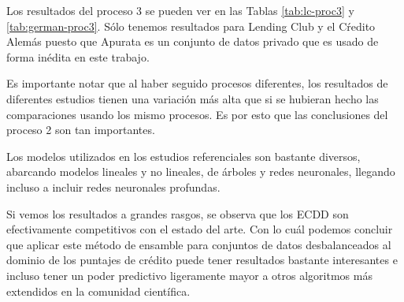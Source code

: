Los resultados del proceso 3 se pueden ver en las Tablas \ref{tab:lc-proc3} y \ref{tab:german-proc3}. Sólo tenemos resultados para Lending Club y el Cŕedito Alemás puesto que Apurata es un conjunto de datos privado que es usado de forma inédita en este trabajo.

Es importante notar que al haber seguido procesos diferentes, los resultados de diferentes estudios tienen una variación más alta que si se hubieran hecho las comparaciones usando los mismo procesos. Es por esto que las conclusiones del proceso 2 son tan importantes.

Los modelos utilizados en los estudios referenciales son bastante diversos, abarcando modelos lineales y no lineales, de árboles y redes neuronales, llegando incluso a incluir redes neuronales profundas.

Si vemos los resultados a grandes rasgos, se observa que los \ac{ECDD} son efectivamente competitivos con el estado del arte. Con lo cuál podemos concluir que aplicar este método de ensamble para conjuntos de datos desbalanceados al dominio de los puntajes de crédito puede tener resultados bastante interesantes e incluso tener un poder predictivo ligeramente mayor a otros algoritmos más extendidos en la comunidad científica. 


